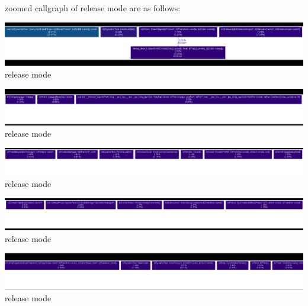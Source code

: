\documentclass[40pt]{article}
\begin{document}
\begin{center}
\Large{zoomed callgraph of release mode are as follows:\newline}
\end{center}


\begin{center}
\includegraphics[scale=0.4]{release1.png}\newline
\small{release mode\\}
\end{center}


\begin{center}
\includegraphics[scale=0.4]{release2.png}\newline
\small{release mode\\}
\end{center}


\begin{center}
\includegraphics[scale=0.4]{release3.png}\newline
\small{release mode\\}
\end{center}


\begin{center}
\includegraphics[scale=0.4]{release4.png}\newline
\small{release mode\\}
\end{center}


\begin{center}
\includegraphics[scale=0.4]{release5.png}\newline
\small{release mode\\}
\end{center}
\end{document}
